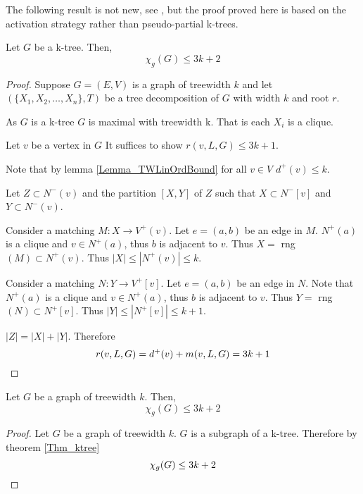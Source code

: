

The following result is not new, see \cite[Wu, Zhu 2008]{WuZhu2008}, but the proof proved here is based on the activation strategy rather than pseudo-partial k-trees.
\begin{theorem} \label{Thm_ktree}
        Let $G$ be a k-tree. Then, 
        \[\chi_g(G) \leq 3k + 2\]
\end{theorem}

\begin{proof}
    Suppose $G=(E,V)$ is a graph of treewidth $k$ and let $(\{X_1,X_2,\dots,X_n\},T)$ be a tree decomposition of $G$ with width $k$ and root $r$.
    
    As $G$ is a k-tree $G$ is maximal with treewidth k. That is each $X_i$ is a clique.
    
    Let $v$ be a vertex in $G$ It suffices to show $r(v,L,G) \leq 3k + 1$.
    
    
    Note that by lemma \ref{Lemma_TWLinOrdBound} for all $v \in V$ $d^+(v) \leq k$.
    
    Let $Z \subset N^-(v)$ and the partition $[X,Y]$ of $Z$ such that $X\subset N^-[v]$ and  $Y\subset N^-(v)$.
           
    Consider a matching $M\colon X \to V^+(v)$. Let $e=(a,b)$ be an edge in $M$.
    $N^+(a)$ is a clique and $v\in N^+(a)$, thus $b$ is adjacent to $v$. Thus $X =$ rng$(M)\subset N^+(v)$. Thus $|X| \leq |N^+(v)| \leq k$. 
    
    Consider a matching $N\colon Y \to V^+[v]$. Let $e=(a,b)$ be an edge in $N$.
    Note that $N^+(a)$ is a clique and $v\in N^+(a)$, thus $b$ is adjacent to $v$. Thus $Y =$ rng$(N)\subset N^+[v]$. Thus $|Y| \leq |N^+[v]| \leq k+1$. 
        
    $|Z| = |X|+|Y|$. Therefore \[r(v,L,G) = d^+(v) + m(v,L,G) = 3k +1 \qedhere\]        
\end{proof}

\begin{corollary}
    Let $G$ be a graph of treewidth $k$. Then, 
    \[\chi_g(G) \leq 3k + 2\]
\end{corollary}

\begin{proof}
    Let $G$ be a graph of treewidth $k$.
    $G$ is a subgraph of a k-tree. Therefore by theorem \ref{Thm_ktree} \[\chi_g(G) \leq 3k + 2 \qedhere\] 
\end{proof}

